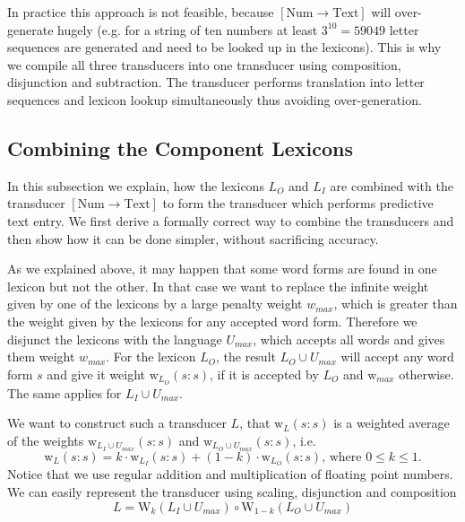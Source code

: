 \documentclass[a4paper,conference]{IEEEtran}
\begin{document}
In practice this approach is not feasible, because
$[\mathrm{Num}\rightarrow\mathrm{Text}]$ will over-generate hugely
(e.g. for a string of ten numbers at least $3^{10} = 59049$ letter
sequences are generated and need to be looked up in the
lexicons). This is why we compile all three transducers into one
transducer using composition, disjunction and subtraction. The
transducer performs translation into letter sequences and lexicon
lookup simultaneously thus avoiding over-generation.

\subsection{Combining the Component Lexicons}

In this subsection we explain, how the lexicons $L_O$ and $L_I$ are
combined with the transducer $[\mathrm{Num}\rightarrow\mathrm{Text}]$
to form the transducer which performs predictive text entry. We first
derive a formally correct way to combine the transducers and then show
how it can be done simpler, without sacrificing accuracy.

As we explained above, it may happen that some word forms are found in
one lexicon but not the other. In that case we want to replace the
infinite weight given by one of the lexicons by a large penalty weight
$w_{max}$, which is greater than the weight given by the lexicons for
any accepted word form. Therefore we disjunct the lexicons with the
language $U_{max}$, which accepts all words and gives them weight
$w_{max}$. For the lexicon $L_O$, the result $L_O \cup U_{max}$ will
accept any word form $s$ and give it weight
$\mathrm{w}_{L_O}(s\mathrm{:}s)$, if it is accepted by $L_O$ and
$\mathrm{w}_{max}$ otherwise. The same applies for $L_I \cup U_{max}$.

We want to construct such a transducer $L$, that $\mathrm{w}_L(s\mathrm{:}s)$
is a weighted average of the weights $\mathrm{w}_{L_I \cup U_{max}}(s\mathrm{:}s)$ and
$\mathrm{w}_{L_O \cup U_{max}}(s\mathrm{:}s)$, i.e.
\begin{equation}
  \mathrm{w}_L(s\mathrm{:}s) = k\cdot \mathrm{w}_{L_I}(s\mathrm{:}s) + (1 - k)\cdot \mathrm{w}_{L_O}(s\mathrm{:}s)\text{, where }0\leq k \leq 1\text{.}
\end{equation}
Notice that we use regular addition and multiplication of floating
point numbers. We can easily represent the transducer using scaling, disjunction and composition
\begin{equation}
  L = \mathrm{W}_k(L_I \cup U_{max}) \circ \mathrm{W}_{1-k}(L_O \cup U_{max})
\end{equation}
\end{document}

